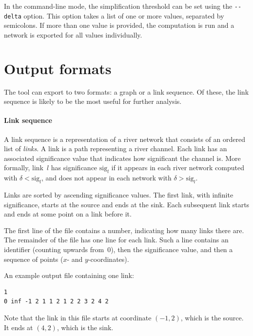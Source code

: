 \documentclass{article}
\begin{document}
In the command-line mode, the simplification threshold can be set using the \texttt{-{}-delta} option. This option takes a list of one or more values, separated by semicolons. If more than one value is provided, the computation is run and a network is exported for all values individually.


\section{Output formats}
\label{sec:output}

The tool can export to two formats: a graph or a link sequence. Of these, the link sequence is likely to be the most useful for further analysis.

\paragraph{Link sequence}
A link sequence is a representation of a river network that consists of an ordered list of \emph{links}. A link is a path representing a river channel. Each link has an associated significance value that indicates how significant the channel is. More formally, link~$l$ has significance $\text{sig}_l$ if it appears in each river network computed with $\delta < \text{sig}_l$, and does not appear in each network with $\delta > \text{sig}_l$.

Links are sorted by ascending significance values. The first link, with infinite significance, starts at the source and ends at the sink. Each subsequent link starts and ends at some point on a link before it.

The first line of the file contains a number, indicating how many links there are. The remainder of the file has one line for each link. Such a line contains an identifier (counting upwards from~$0$), then the significance value, and then a sequence of points ($x$- and $y$-coordinates).

An example output file containing one link:
\begin{verbatim}
1
0 inf -1 2 1 1 2 1 2 2 3 2 4 2
\end{verbatim}

Note that the link in this file starts at coordinate $(-1, 2)$, which is the source. It ends at $(4, 2)$, which is the sink.
\end{document}
